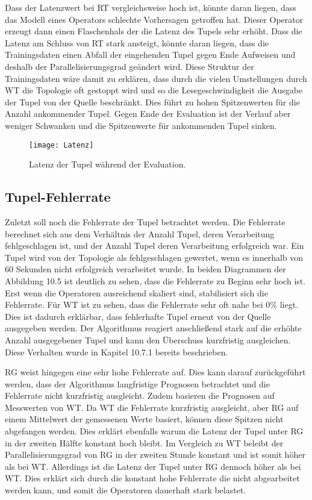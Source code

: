 Dass der Latenzwert bei RT vergleichsweise hoch ist, könnte daran liegen, dass das Modell eines Operators schlechte Vorhersagen getroffen hat.
Dieser Operator erzeugt dann einen Flaschenhals der die Latenz des Tupels sehr erhöht.
Dass die Latenz am Schluss von RT stark ansteigt, könnte daran liegen, dass die Trainingsdaten einen Abfall der eingehenden Tupel gegen Ende Aufweisen und deshalb der Parallelisierungsgrad geändert wird.
Diese Struktur der Trainingsdaten wäre damit zu erklären, dass durch die vielen Umstellungen durch WT die Topologie oft gestoppt wird und so die Lesegeschwindigkeit die Ausgabe der Tupel von der Quelle beschränkt.
Dies führt zu hohen Spitzenwerten für die Anzahl ankommender Tupel.
Gegen Ende der Evaluation ist der Verlauf aber weniger Schwanken und die Spitzenwerte für ankommenden Tupel sinken.

\begin{figure}
\texttt{[image: Latenz]}
\caption{Latenz der Tupel während der Evaluation.}
\end{figure}

\subsection{Tupel-Fehlerrate}

Zuletzt soll noch die Fehlerrate der Tupel betrachtet werden.
Die Fehlerrate berechnet sich aus dem Verhältnis der Anzahl Tupel, deren Verarbeitung fehlgeschlagen ist, und der Anzahl Tupel deren Verarbeitung erfolgreich war.
Ein Tupel wird von der Topologie als fehlgeschlagen gewertet, wenn es innerhalb von 60 Sekunden nicht erfolgreich verarbeitet wurde.
In beiden Diagrammen der Abbildung 10.5 ist deutlich zu sehen, dass die Fehlerrate zu Beginn sehr hoch ist.
Erst wenn die Operatoren ausreichend skaliert sind, stabilisiert sich die Fehlerrate.
Für WT ist zu sehen, dass die Fehlerrate sehr oft nahe bei 0\% liegt.
Dies ist dadurch erklärbar, dass fehlerhafte Tupel erneut von der Quelle ausgegeben werden.
Der Algorithmus reagiert anschließend stark auf die erhöhte Anzahl ausgegebener Tupel und kann den Überschuss kurzfristig ausgleichen.
Diese Verhalten wurde in Kapitel 10.7.1 bereits beschrieben.

RG weist hingegen eine sehr hohe Fehlerrate auf.
Dies kann darauf zurückgeführt werden, dass der Algorithmus langfristige Prognosen betrachtet und die Fehlerrate nicht kurzfristig ausgleicht.
Zudem basieren die Prognosen auf Messwerten von WT.
Da WT die Fehlerrate kurzfristig ausgleicht, aber RG auf einem Mittelwert der gemessenen Werte basiert, können diese Spitzen nicht abgefangen werden.
Dies erklärt ebenfalls warum die Latenz der Tupel unter RG in der zweiten Hälfte konstant hoch bleibt.
Im Vergleich zu WT beleibt der Parallelisierungsgrad von RG in der zweiten Stunde konstant und ist somit höher als bei WT.
Allerdings ist die Latenz der Tupel unter RG dennoch höher als bei WT.
Dies erklärt sich durch die konstant hohe Fehlerrate die nicht abgearbeitet werden kann, und somit die Operatoren dauerhaft stark belastet.

